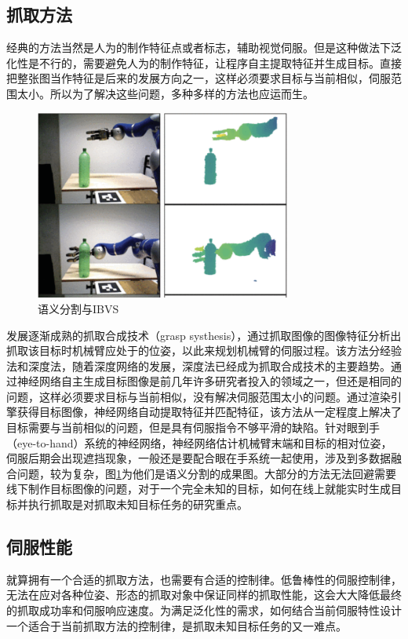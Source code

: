 \documentclass[fontset=fandol,type=bachelor,campus=harbin]{hithesisbook}
\begin{document}
\subsection{抓取方法}
经典的方法当然是人为的制作特征点或者标志，辅助视觉伺服。但是这种做法下泛化性是不行的，需要避免人为的制作特征，让程序自主提取特征并生成目标。直接把整张图当作特征是后来的发展方向之一，这样必须要求目标与当前相似，伺服范围太小。所以为了解决这些问题，多种多样的方法也应运而生。
\begin{figure}[h]
\centering
\includegraphics[width = 0.75\textwidth]{chapter1/语义分割IBVS}
\caption{语义分割与IBVS}
\label{语义分割IBVS}
\end{figure}


发展逐渐成熟的抓取合成技术（grasp systhesis），通过抓取图像的图像特征分析出抓取该目标时机械臂应处于的位姿，以此来规划机械臂的伺服过程\cite{varley2015generating}。该方法分经验法和深度法，随着深度网络的发展，深度法已经成为抓取合成技术的主要趋势。通过神经网络自主生成目标图像是前几年许多研究者投入的领域之一，但还是相同的问题，这样必须要求目标与当前相似，没有解决伺服范围太小的问题。通过渲染引擎获得目标图像，神经网络自动提取特征并匹配特征\cite{adrian2022dfbvs}，该方法从一定程度上解决了目标需要与当前相似的问题，但是具有伺服指令不够平滑的缺陷。针对眼到手（eye-to-hand）系统的神经网络，神经网络估计机械臂末端和目标的相对位姿，伺服后期会出现遮挡现象，一般还是要配合眼在手系统一起使用，涉及到多数据融合问题，较为复杂\cite{rauch2019learning}，图\ref{语义分割IBVS}为他们是语义分割的成果图。大部分的方法无法回避需要线下制作目标图像的问题，对于一个完全未知的目标，如何在线上就能实时生成目标并执行抓取是对抓取未知目标任务的研究重点。
\subsection{伺服性能}
就算拥有一个合适的抓取方法，也需要有合适的控制律。低鲁棒性的伺服控制律，无法在应对各种位姿、形态的抓取对象中保证同样的抓取性能，这会大大降低最终的抓取成功率和伺服响应速度。为满足泛化性的需求，如何结合当前伺服特性设计一个适合于当前抓取方法的控制律，是抓取未知目标任务的又一难点。
\end{document}
